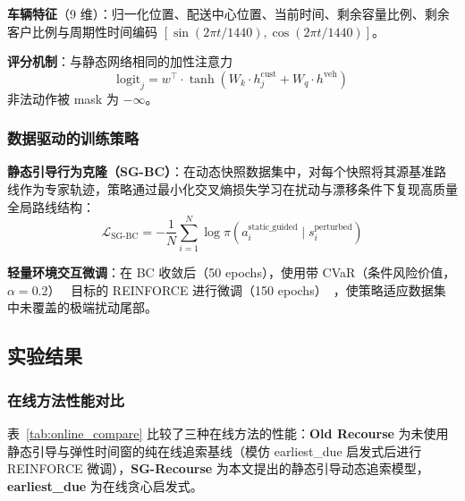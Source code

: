 \documentclass[12pt,a4paper,UTF8]{article}
\begin{document}
\textbf{车辆特征}（9 维）：归一化位置、配送中心位置、当前时间、剩余容量比例、剩余客户比例与周期性时间编码 $[\sin(2\pi t/1440), \cos(2\pi t/1440)]$。

\textbf{评分机制}：与静态网络相同的加性注意力
\[
\text{logit}_j = w^{\top} \cdot \tanh(W_k \cdot h^{\text{cust}}_j + W_q \cdot h^{\text{veh}})
\]
非法动作被 mask 为 $-\infty$。

\subsubsection{数据驱动的训练策略}

\textbf{静态引导行为克隆（SG-BC）}：在动态快照数据集中，对每个快照将其源基准路线作为专家轨迹，策略通过最小化交叉熵损失学习在扰动与漂移条件下复现高质量全局路线结构：
\[
\mathcal{L}_{\text{SG-BC}} = -\frac{1}{N}\sum_{i=1}^{N} \log \pi(a_i^{\text{static\_guided}} \mid s_i^{\text{perturbed}})
\]

\textbf{轻量环境交互微调}：在 BC 收敛后（50 epochs），使用带 CVaR（条件风险价值，$\alpha=0.2$）~\cite{chow2015risk} 目标的 REINFORCE 进行微调（150 epochs）~\cite{silver2016mastering}，使策略适应数据集中未覆盖的极端扰动尾部。


\subsection{实验结果}

\subsubsection{在线方法性能对比}

表~\ref{tab:online_compare} 比较了三种在线方法的性能：\textbf{Old Recourse} 为未使用静态引导与弹性时间窗的纯在线追索基线（模仿 earliest\_due 启发式后进行 REINFORCE 微调），\textbf{SG-Recourse} 为本文提出的静态引导动态追索模型，\textbf{earliest\_due} 为在线贪心启发式。
\end{document}
